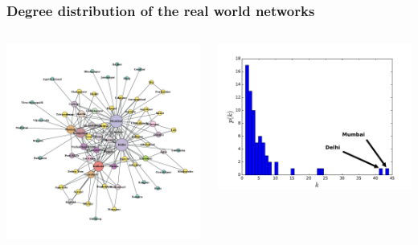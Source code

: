 \documentclass{beamer}
\begin{document}
\begin{frame}
    \frametitle{Degree distribution of the real world networks}
    \begin{columns}
        \centering
        \includegraphics[width=\columnwidth]{airports_network_India.pdf}

        \centering
        \includegraphics[width=\columnwidth,trim=30 0 0 0,clip=true]{deg_distri_india.pdf}
    
    \end{columns}
\end{frame}
\end{document}
